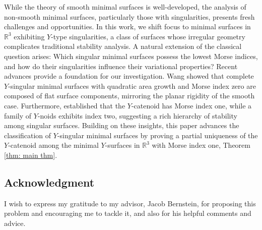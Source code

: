 \documentclass[11pt]{amsart}
\numberwithin{equation}{section}
\theoremstyle{theorem}
\theoremstyle{definition}
\numberwithin{equation}{section}
\begin{document}
While the theory of smooth minimal surfaces is well-developed, the analysis of non-smooth minimal surfaces, particularly those with singularities, presents fresh challenges and opportunities. In this work, we shift focus to minimal surfaces in $\mathbb{R}^3$ exhibiting $Y$-type singularities, a class of surfaces whose irregular geometry complicates traditional stability analysis. A natural extension of the classical question arises: Which singular minimal surfaces possess the lowest Morse indices, and how do their singularities influence their variational properties? Recent advances provide a foundation for our investigation. Wang \cite{wang2022curvature} showed that complete $Y$-singular minimal surfaces with quadratic area growth and Morse index zero are composed of flat surface components, mirroring the planar rigidity of the smooth case. Furthermore, \cite{matinpour2024morse} established that the $Y$-catenoid has Morse index one, while a family of $Y$-noids exhibits index two, suggesting a rich hierarchy of stability among singular surfaces. Building on these insights, this paper advances the classification of $Y$-singular minimal surfaces by proving a partial uniqueness of the $Y$-catenoid among the minimal $Y$-surfaces in $\mathbb{R}^3$ with Morse index one, Theorem \ref{thm: main thm}. 


\subsection*{Acknowledgment}
I wish to express my gratitude to my advisor, Jacob Bernstein, for proposing this problem and encouraging me to tackle it, and also for his helpful comments and advice. 

\end{document}
